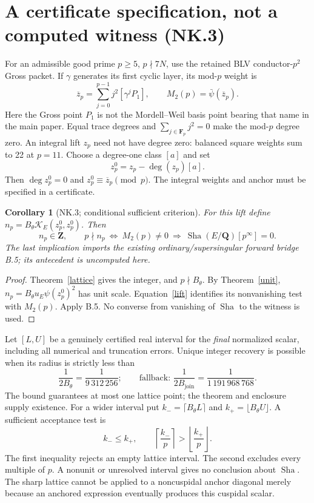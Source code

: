 \documentclass[11pt]{article}
\newcommand{\Q}{\mathbf Q}
\newcommand{\Z}{\mathbf Z}
\newcommand{\F}{\mathbf F}
\newcommand{\K}{\mathscr K_E}
\newcommand{\Sha}{\operatorname{Sha}}
\newtheorem{corollary}{Corollary}
\begin{document}
\section{A certificate specification, not a computed witness (NK.3)}
For an admissible good prime $p\ge5$, $p\nmid7N$, use the retained BLV
conductor-$p^2$ Gross packet. If $\gamma$ generates its first cyclic
layer, its mod-$p$ weight is
\[
 \overline z_p=\sum_{j=0}^{p-1}j^2[\gamma^jP_1],\qquad
 M_2(p)=\bar\psi(\overline z_p).
\]
Here the Gross point $P_1$ is not the Mordell--Weil basis point bearing
that name in the main paper. Equal trace degrees and
$\sum_{j\in\F_p}j^2=0$ make the mod-$p$ degree zero.
An integral lift $z_p$ need not have degree zero: balanced square
weights sum to 22 at $p=11$. Choose a degree-one class $[a]$ and set
\begin{equation}\label{lift}
 z_p^0=z_p-\deg(z_p)[a].
\end{equation}
Then $\deg z_p^0=0$ and $z_p^0\equiv\overline z_p\pmod p$.
The integral weights and anchor must be specified in a certificate.

\begin{corollary}[NK.3; conditional sufficient criterion]
For this lift define $n_p=B_\theta\K(z_p^0,z_p^0)$. Then
\[
 n_p\in\Z,\qquad
 p\nmid n_p\ \Longleftrightarrow\ M_2(p)\ne0
 \ \Longrightarrow\ \Sha(E/\Q)[p^\infty]=0.
\]
The last implication imports the existing ordinary/supersingular
forward bridge B.5; its antecedent is uncomputed here.
\end{corollary}
\begin{proof}
Theorem~\ref{lattice} gives the integer, and $p\nmid B_\theta$.
By Theorem~\ref{unit}, $n_p=B_\theta u_E\psi(z_p^0)^2$ has unit scale.
Equation~\eqref{lift} identifies its nonvanishing test with $M_2(p)$.
Apply B.5. No converse from vanishing of $\Sha$ to the witness is used.
\end{proof}

Let $[L,U]$ be a genuinely certified real interval for the \emph{final}
normalized scalar, including all numerical and truncation errors. Unique
integer recovery is possible when its radius is strictly less than
\[
 \frac1{2B_\theta}=\frac1{9\,312\,256};\qquad
 \text{fallback: }\frac1{2B_{\mathrm{join}}}=\frac1{1\,191\,968\,768}.
\]
The bound guarantees at most one lattice point; the theorem and enclosure
supply existence. For a wider interval put
$k_-=\lceil B_\theta L\rceil$ and $k_+=\lfloor B_\theta U\rfloor$.
A sufficient acceptance test is
\[
 k_-\le k_+,\qquad
 \left\lceil\frac{k_-}{p}\right\rceil>
 \left\lfloor\frac{k_+}{p}\right\rfloor.
\]
The first inequality rejects an empty lattice interval. The second excludes
every multiple of $p$. A nonunit or unresolved interval gives no conclusion
about $\Sha$. The sharp lattice cannot be applied to a noncuspidal anchor
diagonal merely because an anchored expression eventually produces this
cuspidal scalar.
\end{document}
